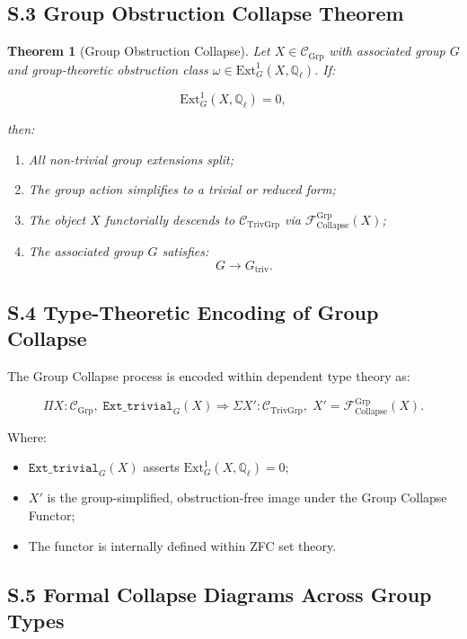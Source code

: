 \documentclass[11pt]{article}
\newtheorem{theorem}{Theorem}[section]
\begin{document}
\subsection*{S.3 Group Obstruction Collapse Theorem}

\begin{theorem}[Group Obstruction Collapse]
Let $X \in \mathcal{C}_{\mathrm{Grp}}$ with associated group $G$ and group-theoretic obstruction class $\omega \in \mathrm{Ext}^1_G(X, \mathbb{Q}_\ell)$. If:

\[
\mathrm{Ext}^1_G(X, \mathbb{Q}_\ell) = 0,
\]

then:
\begin{enumerate}
    \item All non-trivial group extensions split;
    \item The group action simplifies to a trivial or reduced form;
    \item The object $X$ functorially descends to $\mathcal{C}_{\mathrm{TrivGrp}}$ via $\mathcal{F}_{\mathrm{Collapse}}^{\mathrm{Grp}}(X)$;
    \item The associated group $G$ satisfies:
    \[
    G \longrightarrow G_{\mathrm{triv}}.
    \]
\end{enumerate}
\end{theorem}

\subsection*{S.4 Type-Theoretic Encoding of Group Collapse}

The Group Collapse process is encoded within dependent type theory as:

\[
\Pi X : \mathcal{C}_{\mathrm{Grp}},\;
\texttt{Ext\_trivial}_G(X)
\Rightarrow
\Sigma X' : \mathcal{C}_{\mathrm{TrivGrp}},\;
X' = \mathcal{F}_{\mathrm{Collapse}}^{\mathrm{Grp}}(X).
\]

Where:
\begin{itemize}
    \item $\texttt{Ext\_trivial}_G(X)$ asserts $\mathrm{Ext}^1_G(X, \mathbb{Q}_\ell) = 0$;
    \item $X'$ is the group-simplified, obstruction-free image under the Group Collapse Functor;
    \item The functor is internally defined within ZFC set theory.
\end{itemize}

\subsection*{S.5 Formal Collapse Diagrams Across Group Types}
\end{document}
